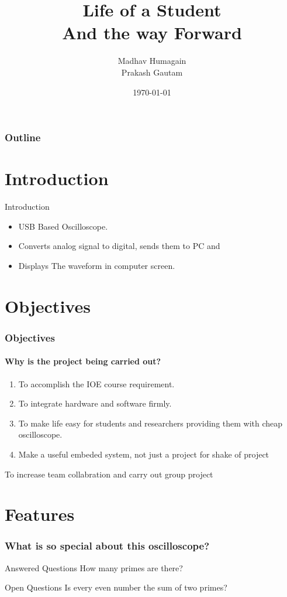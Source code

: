 \documentclass[aspectratio=169]{beamer}
\author{Madhav Humagain\\ Prakash Gautam\\}
\title{Life of a Student\\ And the way Forward}
\date{\today}
\begin{document}
 
\begin{frame}
\titlepage
\end{frame}

\begin{frame}
\frametitle{Outline}
\tableofcontents
\end{frame}
\newpage

\section{Introduction}
\begin{frame}{Introduction}


\begin{itemize}
\item USB Based Oscilloscope.
\pause
\item Converts analog signal to digital, sends them to PC and
\pause
\item Displays The waveform in computer screen.
\pause
\end{itemize}
\end{frame}


\section{Objectives}
\begin{frame}
\frametitle{Objectives}
\framesubtitle{Why is the project being carried out?}

\begin{enumerate}
\item<1-> To accomplish the IOE course requirement.
\item<2-> To integrate hardware and software firmly.
\item<3-> To make life easy for students and researchers providing them with cheap oscilloscope.
\item<4-> Make a useful embeded system, not just a project for shake of project
\end{enumerate}
 {To increase team collabration and carry out group project }
\end{frame}


\section{Features}
\begin{frame}
	\frametitle{What is so special about this oscilloscope?}
	\begin{block}{Answered Questions}
		How many primes are there?
	\end{block}
	
	\begin{block}{Open Questions}
Is every even number the sum of two primes?
\end{block}
\end{frame}
\end{document}
